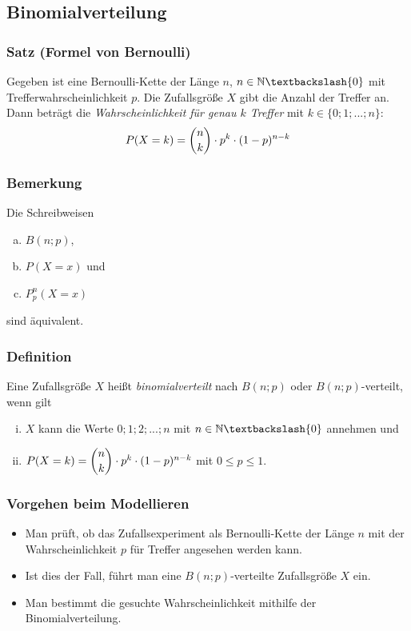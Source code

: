 \documentclass[a4paper,12pt]{article}
\newcommand{\N}{\mathbb{N}}
\begin{document}
\subsection{Binomialverteilung}
\subsubsection{Satz (Formel von Bernoulli)}
Gegeben ist eine Bernoulli-Kette der Länge $n$, $n \in \N \textbackslash \{ 0 \}$ mit Trefferwahrscheinlichkeit $p$. Die Zufallsgröße $X$ gibt die Anzahl der Treffer an. Dann beträgt die \emph{Wahrscheinlichkeit für genau $k$ Treffer} mit $k \in \{ 0; 1; ...; n \}$: 
\[ P(X=k)=\dbinom{n}{k}\cdot p^k \cdot (1-p)^{n-k} \]

\subsubsection{Bemerkung}
Die Schreibweisen
\begin{enumerate}[(a)]
\item $B(n;p)$,
\item $ P(X=x)$ und
\item $P_p^n(X=x)$
\end{enumerate}
sind äquivalent.


\subsubsection{Definition}
Eine Zufallsgröße $X$ heißt \emph{binomialverteilt} nach $B(n;p)$ oder $B(n;p)$-verteilt, wenn gilt
\begin{enumerate}[(i)]
\item $X$ kann die Werte $0;1;2;...;n$ mit $n \in \N \textbackslash \{ 0 \}$ annehmen und
\item $P(X=k)=\dbinom{n}{k}\cdot p^k \cdot (1-p)^{n-k}$ mit $0\leq p \leq 1$.
\end{enumerate}

\subsubsection{Vorgehen beim Modellieren}
\begin{itemize}
\item Man prüft, ob das Zufallsexperiment als Bernoulli-Kette der Länge $n$ mit der Wahrscheinlichkeit $p$ für Treffer angesehen werden kann.
\item Ist dies der Fall, führt man eine $B(n;p)$-verteilte Zufallsgröße $X$ ein.
\item Man bestimmt die gesuchte Wahrscheinlichkeit mithilfe der Binomialverteilung.
\end{itemize}
\end{document}
